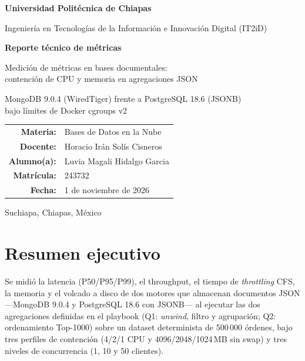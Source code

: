 \documentclass[11pt,a4paper]{article}
\newcommand{\alumno}{Luvia Magali Hidalgo Garcia}
\newcommand{\matricula}{243732}
\newcommand{\docente}{Horacio Irán Solís Cisneros}
\begin{document}
\begin{titlepage}
\centering
{\large\bfseries\color{verde} Universidad Politécnica de Chiapas\par}
{\normalsize Ingeniería en Tecnologías de la Información e Innovación Digital (IT2iD)\par}
\vspace{2.5cm}
{\LARGE\bfseries Reporte técnico de métricas\par}
\vspace{0.5cm}
{\Large Medición de métricas en bases documentales:\\[2pt]
contención de CPU y memoria en agregaciones JSON\par}
\vspace{0.4cm}
{\large MongoDB 9.0.4 (WiredTiger) frente a PostgreSQL 18.6 (JSONB)\\ bajo límites de Docker cgroups v2\par}
\vspace{2.5cm}
\begin{tabular}{rl}
\textbf{Materia:} & Bases de Datos en la Nube\\
\textbf{Docente:} & \docente\\
\textbf{Alumno(a):} & \alumno\\
\textbf{Matrícula:} & \matricula\\
\textbf{Fecha:} & 1 de noviembre de 2026\\
\end{tabular}
\vfill
{\small Suchiapa, Chiapas, México\par}
\end{titlepage}

\section*{Resumen ejecutivo}

Se midió la latencia (P50/P95/P99), el throughput, el tiempo de \emph{throttling} CFS, la memoria y el volcado a disco de dos motores que almacenan documentos JSON ---MongoDB 9.0.4 y PostgreSQL 18.6 con JSONB--- al ejecutar las dos agregaciones definidas en el playbook (Q1: \emph{unwind}, filtro y agrupación; Q2: ordenamiento Top-1000) sobre un dataset determinista de 500\,000 órdenes, bajo tres perfiles de contención (4/2/1 CPU y 4096/2048/1024\,MB sin swap) y tres niveles de concurrencia (1, 10 y 50 clientes).
\end{document}
